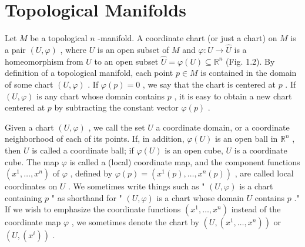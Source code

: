 

\section{Topological Manifolds}

\begin{definition}
\label{def:1-extra-2}
\mathlibok
Let $M$ be a topological $n$ -manifold. A coordinate chart (or just a chart) on $M$ is a pair $\left( {U,\varphi }\right)$ , where $U$ is an open subset of $M$ and $\varphi  : U \rightarrow  \widehat{U}$ is a homeomorphism from $U$ to an open subset $\widehat{U} = \varphi \left( U\right)  \subseteq  {\mathbb{R}}^{n}$ (Fig. 1.2). By definition of a topological manifold, each point $p \in  M$ is contained in the domain of some chart $\left( {U,\varphi }\right)$ . If $\varphi \left( p\right)  = 0$ , we say that the chart is centered at $p$ . If $\left( {U,\varphi }\right)$ is any chart whose domain contains $p$ , it is easy to obtain a new chart centered at $p$ by subtracting the constant vector $\varphi \left( p\right)$ .

Given a chart $\left( {U,\varphi }\right)$ , we call the set $U$ a coordinate domain, or a coordinate neighborhood of each of its points. If, in addition, $\varphi \left( U\right)$ is an open ball in ${\mathbb{R}}^{n}$ , then $U$ is called a coordinate ball; if $\varphi \left( U\right)$ is an open cube, $U$ is a coordinate cube. The map $\varphi$ is called a (local) coordinate map, and the component functions $\left( {{x}^{1},\ldots ,{x}^{n}}\right)$ of $\varphi$ , defined by $\varphi \left( p\right)  = \left( {{x}^{1}\left( p\right) ,\ldots ,{x}^{n}\left( p\right) }\right)$ , are called local coordinates on $U$ . We sometimes write things such as " $\left( {U,\varphi }\right)$ is a chart containing $p$ " as shorthand for " $\left( {U,\varphi }\right)$ is a chart whose domain $U$ contains $p$ ." If we wish to emphasize the coordinate functions $\left( {{x}^{1},\ldots ,{x}^{n}}\right)$ instead of the coordinate map $\varphi$ , we sometimes denote the chart by $\left( {U,\left( {{x}^{1},\ldots ,{x}^{n}}\right) }\right)$ or $\left( {U,\left( {x}^{i}\right) }\right)$ .
\end{definition}

